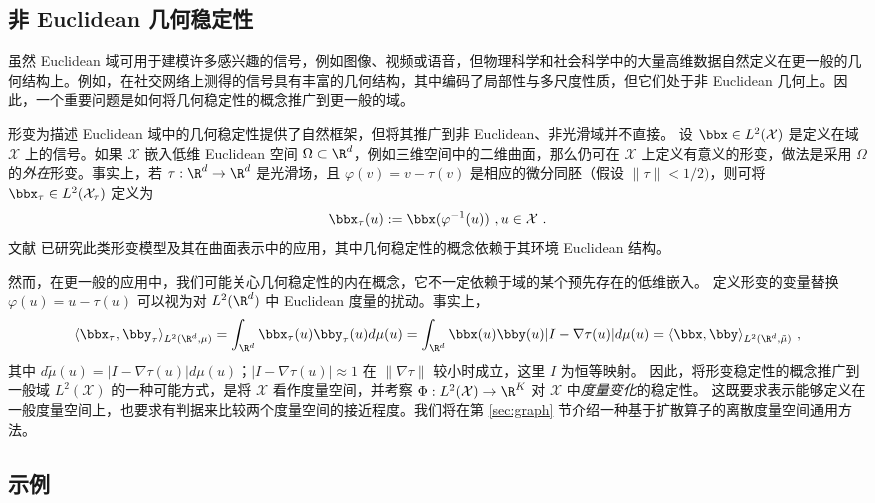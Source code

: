 \subsection{非 Euclidean 几何稳定性}
\label{sec:noneuclideanstab}

虽然 Euclidean 域可用于建模许多感兴趣的信号，例如图像、视频或语音，但物理科学和社会科学中的大量高维数据自然定义在更一般的几何结构上。例如，在社交网络上测得的信号具有丰富的几何结构，其中编码了局部性与多尺度性质，但它们处于非 Euclidean 几何上。因此，一个重要问题是如何将几何稳定性的概念推广到更一般的域。

形变为描述 Euclidean 域中的几何稳定性提供了自然框架，但将其推广到非 Euclidean、非光滑域并不直接。
设 $\bbx \in L^2(\mathcal{X})$ 是定义在域 $\mathcal{X}$ 上的信号。如果 $\mathcal{X}$ 嵌入低维 Euclidean 空间 $\Omega \subset \R^d$，例如三维空间中的二维曲面，那么仍可在 $\mathcal{X}$ 上定义有意义的形变，做法是采用 $\Omega$ 的\emph{外在}形变。事实上，若 $\tau: \R^d \to \R^d$ 是光滑场，且 $\varphi(v) = v - \tau(v)$ 是相应的微分同胚（假设 $\| \tau\| < 1/2)$，则可将 $\bbx_\tau \in L^2( \mathcal{X}_\tau)$ 定义为
$$\bbx_\tau(u) := \bbx(\varphi^{-1}(u))~,u \in \mathcal{X}~.$$
文献 \citep{kostrikov2017surface} 已研究此类形变模型及其在曲面表示中的应用，其中几何稳定性的概念依赖于其环境 Euclidean 结构。

然而，在更一般的应用中，我们可能关心几何稳定性的内在概念，它不一定依赖于域的某个预先存在的低维嵌入。
定义形变的变量替换 $\varphi(u) = u - \tau(u)$ 可以视为对 $L^2(\R^d)$ 中 Euclidean 度量的扰动。事实上，
\begin{equation} \nonumber
    \langle \bbx_\tau, \bby_\tau \rangle_{L^2(\R^d,\mu)} = \int_{\R^d} \bbx_\tau(u) \bby_\tau(u) d\mu(u) = \int_{\R^d} \bbx(u) \bby(u) | I - \nabla \tau(u)| d\mu(u) = \langle \bbx, \bby \rangle_{L^2(\R^d, \tilde{\mu})}~,
\end{equation}
其中 $d\tilde{\mu}(u) = | I - \nabla \tau(u)| d\mu(u)$；$| I - \nabla \tau(u)| \approx 1$ 在 $\| \nabla \tau \|$ 较小时成立，这里 $I$ 为恒等映射。
因此，将形变稳定性的概念推广到一般域 $L^2(\mathcal{X})$ 的一种可能方式，是将 $\mathcal{X}$ 看作度量空间，并考察 $\Phi: L^2(\mathcal{X}) \to \R^K$ 对 $\mathcal{X}$ 中\emph{度量变化}的稳定性。
这既要求表示能够定义在一般度量空间上，也要求有判据来比较两个度量空间的接近程度。我们将在第 \ref{sec:graph} 节介绍一种基于扩散算子的离散度量空间通用方法。

\subsection{示例}
\label{sec:geomexamples}

